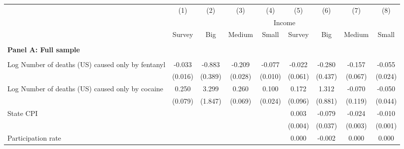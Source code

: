 \begin{tabular}{lcccccccc} \\ \hline 
                    &\multicolumn{1}{c}{(1)}         &\multicolumn{1}{c}{(2)}         &\multicolumn{1}{c}{(3)}         &\multicolumn{1}{c}{(4)}         &\multicolumn{1}{c}{(5)}         &\multicolumn{1}{c}{(6)}         &\multicolumn{1}{c}{(7)}         &\multicolumn{1}{c}{(8)}         \\
 & \multicolumn{8}{c}{Income} \\ \cline{2-5} \cline{6-9}   & Survey  &  \multicolumn{1}{c}{Big} & \multicolumn{1}{c}{Medium}& \multicolumn{1}{c}{Small} & Survey  &  \multicolumn{1}{c}{Big} & \multicolumn{1}{c}{Medium}& \multicolumn{1}{c}{Small} \\ \hline  & & & & &  &  &  &  \\ \textbf{Panel A: Full sample} \\ & & & & & & & & \\
Log Number of deaths (US) caused only by fentanyl&      -0.033\sym{*}  &      -0.883\sym{*}  &      -0.209\sym{***}&      -0.077\sym{***}&      -0.022         &      -0.280         &      -0.157\sym{*}  &      -0.055\sym{*}  \\
                    &     (0.016)         &     (0.389)         &     (0.028)         &     (0.010)         &     (0.061)         &     (0.437)         &     (0.067)         &     (0.024)         \\
\addlinespace
Log Number of deaths (US) caused only by cocaine&       0.250\sym{**} &       3.299         &       0.260\sym{***}&       0.100\sym{***}&       0.172         &       1.312         &      -0.070         &      -0.050         \\
                    &     (0.079)         &     (1.847)         &     (0.069)         &     (0.024)         &     (0.096)         &     (0.881)         &     (0.119)         &     (0.044)         \\
\addlinespace
State CPI           &                     &                     &                     &                     &       0.003         &      -0.079\sym{*}  &      -0.024\sym{***}&      -0.010\sym{***}\\
                    &                     &                     &                     &                     &     (0.004)         &     (0.037)         &     (0.003)         &     (0.001)         \\
\addlinespace
Participation rate  &                     &                     &                     &                     &       0.000         &      -0.002         &       0.000         &       0.000         \\

\end{tabular}
